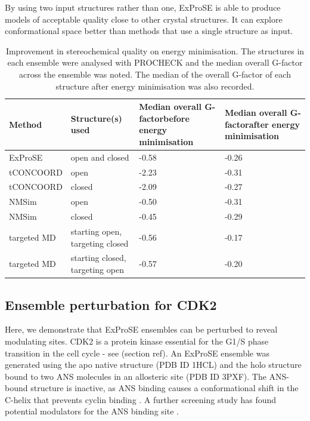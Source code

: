 By using two input structures rather than one, ExProSE is able to produce models of acceptable quality close to other crystal structures.
It can explore conformational space better than methods that use a single structure as input.


\begin{table}
\centering

\begin{footnotesize}
\begin{tabular}{ l l p{3cm} p{3cm} }
\hline
\textbf{Method} & \textbf{Structure(s) used} & \textbf{Median overall G-factor\newline before energy minimisation} & \textbf{Median overall G-factor\newline after energy minimisation} \\
\hline
ExProSE     & open and closed                 & -0.58 & -0.26 \\
tCONCOORD   & open                            & -2.23 & -0.31 \\
tCONCOORD   & closed                          & -2.09 & -0.27 \\
NMSim       & open                            & -0.50 & -0.31 \\
NMSim       & closed                          & -0.45 & -0.29 \\
targeted MD & starting open, targeting closed & -0.56 & -0.17 \\
targeted MD & starting closed, targeting open & -0.57 & -0.20 \\
\hline
\end{tabular}
\end{footnotesize}

\caption{Improvement in stereochemical quality on energy minimisation.
The structures in each ensemble were analysed with PROCHECK and the median overall G-factor across the ensemble was noted.
The median of the overall G-factor of each structure after energy minimisation was also recorded.}

\label{tab:energy_minimisation}
\end{table}


\subsection{Ensemble perturbation for CDK2}

Here, we demonstrate that ExProSE ensembles can be perturbed to reveal modulating sites.
CDK2 is a protein kinase essential for the G1/S phase transition in the cell cycle - see (section ref).
An ExProSE ensemble was generated using the apo native structure (PDB ID 1HCL) and the holo structure bound to two ANS molecules in an allosteric site (PDB ID 3PXF).
The ANS-bound structure is inactive, as ANS binding causes a conformational shift in the C-helix that prevents cyclin binding \cite{Betzi2011}.
A further screening study has found potential modulators for the ANS binding site \cite{Rastelli2014}.

